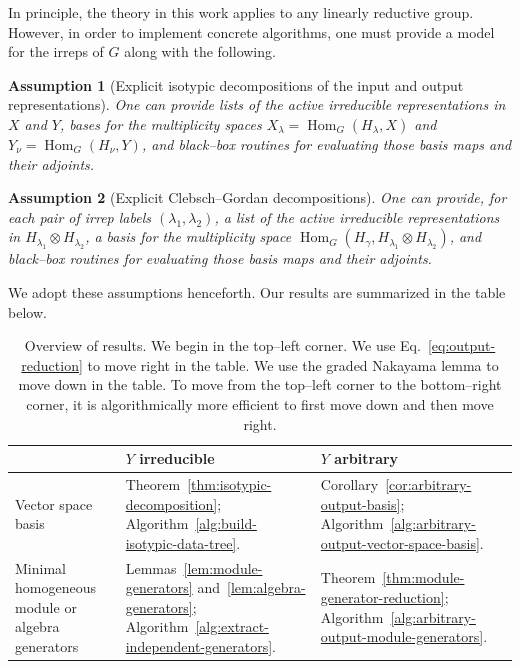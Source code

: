 \documentclass[11pt]{article}
\newcommand{\HomG}[2]{\operatorname{Hom}_G\!\left(#1,#2\right)}
\newtheorem{assumption}{Assumption}[section]
\theoremstyle{definition}
\begin{document}
In principle, the theory in this work applies to any linearly reductive group. However, in order to implement concrete algorithms, one must provide a model for the irreps of $G$ along with the following.

\begin{assumption}[Explicit isotypic decompositions of the input and output representations]\label{ass:explicit-isotypic}
  One can provide lists of the active irreducible representations in $X$ and $Y$, bases for the multiplicity spaces $X_\lambda = \HomG{H_\lambda}{X}$ and $Y_\nu = \HomG{H_\nu}{Y}$, and black--box routines for evaluating those basis maps and their adjoints.
\end{assumption}

\begin{assumption}[Explicit Clebsch--Gordan decompositions]\label{ass:explicit-cg}
  One can provide, for each pair of irrep labels $(\lambda_1,\lambda_2)$, a list of the active irreducible representations in $H_{\lambda_1} \otimes H_{\lambda_2}$, a basis for the multiplicity space $\HomG{H_\gamma}{H_{\lambda_1} \otimes H_{\lambda_2}}$, and black--box routines for evaluating those basis maps and their adjoints.
\end{assumption}

We adopt these assumptions henceforth. Our results are summarized in the table below.

\begin{table}[htbp]
  \centering
  \small
  \setlength{\tabcolsep}{5pt}
  \begin{tabular}{>{\raggedright\arraybackslash}p{}
    >{\raggedright\arraybackslash}p{}
    >{\raggedright\arraybackslash}p{}}
    \toprule
    & $Y$ irreducible & $Y$ arbitrary \\
    \midrule
    Vector space basis
    &
    Theorem~\ref{thm:isotypic-decomposition}; Algorithm~\ref{alg:build-isotypic-data-tree}.
    &
    Corollary~\ref{cor:arbitrary-output-basis}; Algorithm~\ref{alg:arbitrary-output-vector-space-basis}.
    \\[0.5em]
    Minimal homogeneous module or algebra generators
    &
    Lemmas~\ref{lem:module-generators} and~\ref{lem:algebra-generators}; Algorithm~\ref{alg:extract-independent-generators}.
    &
    Theorem~\ref{thm:module-generator-reduction}; Algorithm~\ref{alg:arbitrary-output-module-generators}.
    \\
    \bottomrule
  \end{tabular}
  \caption{Overview of results. We begin in the top--left corner. We use Eq.~\eqref{eq:output-reduction} to move right in the table. We use the graded Nakayama lemma to move down in the table. To move from the top--left corner to the bottom--right corner, it is algorithmically more efficient to first move down and then move right.}
  \label{tab:main-results-guide}
\end{table}
\end{document}

